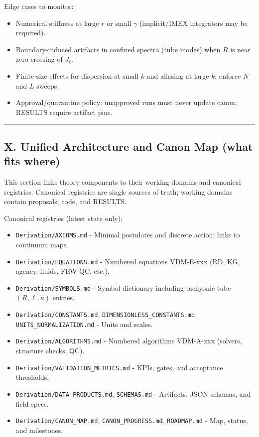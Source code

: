 \documentclass[
]{article}
\providecommand{\tightlist}{%
  \setlength{\itemsep}{0pt}\setlength{\parskip}{0pt}}
\begin{document}
Edge cases to monitor:

\begin{itemize}
\tightlist
\item
  Numerical stiffness at large \(r\) or small \(\gamma\) (implicit/IMEX
  integrators may be required).
\item
  Boundary-induced artifacts in confined spectra (tube modes) when \(R\)
  is near zero-crossing of \(J_{\ell}\).
\item
  Finite-size effects for dispersion at small \(k\) and aliasing at
  large \(k\); enforce \(N\) and \(L\) sweeps.
\item
  Approval/quarantine policy: unapproved runs must never update canon;
  RESULTS require artifact pins.
\end{itemize}

\begin{center}\rule{0.5\linewidth}{0.5pt}\end{center}

\hypertarget{x.-unified-architecture-and-canon-map-what-fits-where}{%
\subsection{X. Unified Architecture and Canon Map (what fits
where)}\label{x.-unified-architecture-and-canon-map-what-fits-where}}

This section links theory components to their working domains and
canonical registries. Canonical registries are single sources of truth;
working domains contain proposals, code, and RESULTS.

Canonical registries (latest state only):

\begin{itemize}
\tightlist
\item
  \texttt{Derivation/AXIOMS.md} - Minimal postulates and discrete
  action; links to continuum maps.
\item
  \texttt{Derivation/EQUATIONS.md} - Numbered equations VDM-E-xxx (RD,
  KG, agency, fluids, FRW QC, etc.).
\item
  \texttt{Derivation/SYMBOLS.md} - Symbol dictionary including tachyonic
  tube \((R,\ell,\kappa)\) entries.
\item
  \texttt{Derivation/CONSTANTS.md},
  \texttt{DIMENSIONLESS\_CONSTANTS.md}, \texttt{UNITS\_NORMALIZATION.md}
  - Units and scales.
\item
  \texttt{Derivation/ALGORITHMS.md} - Numbered algorithms VDM-A-xxx
  (solvers, structure checks, QC).
\item
  \texttt{Derivation/VALIDATION\_METRICS.md} - KPIs, gates, and
  acceptance thresholds.
\item
  \texttt{Derivation/DATA\_PRODUCTS.md}, \texttt{SCHEMAS.md} -
  Artifacts, JSON schemas, and field specs.
\item
  \texttt{Derivation/CANON\_MAP.md}, \texttt{CANON\_PROGRESS.md},
  \texttt{ROADMAP.md} - Map, status, and milestones.
\end{itemize}
\end{document}
